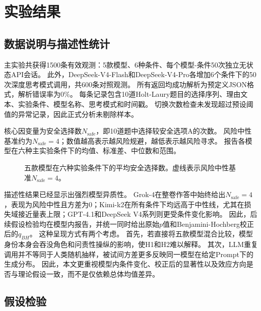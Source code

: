 \section{实验结果}

\subsection{数据说明与描述性统计}

主实验共获得1500条有效观测：5款模型、6种条件、每个模型-条件50次独立无状态API会话。
此外，DeepSeek-V4-Flash和DeepSeek-V4-Pro各增加6个条件下的50次深度思考模式调用，共600条对照观测。
所有返回均成功解析为预定义JSON格式，解析错误率为0\%。
每条记录包含10道Holt-Laury题目的选择序列、理由文本、实验条件、模型名称、思考模式和时间戳。
切换次数检查未发现超过预设阈值的异常记录，因此正式分析未剔除样本。

核心因变量为安全选择数$N_{\text{safe}}$，即10道题中选择较安全选项A的次数。
风险中性基准约为$N_{\text{safe}}=4$；数值越高表示越风险规避，越低表示越风险寻求。
报告各模型在六种主实验条件下的均值、标准差、中位数和范围。



\begin{figure}[!htbp]
  \centering
  
  \caption{五款模型在六种实验条件下的平均安全选择数。虚线表示风险中性基准$N_{\text{safe}}=4$。}
  \label{fig:mean_comparison}
\end{figure}

描述性结果已经显示出强烈模型异质性。
Grok-4在整卷作答中始终给出$N_{\text{safe}}=4$，表现为风险中性且方差为0；Kimi-k2在所有条件下均远高于中性线，尤其在损失域接近量表上限；GPT-4.1和DeepSeek V4系列则更受条件变化影响。
因此，后续假设检验均在模型内报告，并统一同时给出原始$p$值和Benjamini-Hochberg校正后的$q_{BH}$。
这种呈现方式有两个考虑。
首先，若直接将五款模型混合比较，模型身份本身会吞没角色和问责性操纵的影响，使H1和H2难以解释。
其次，LLM重复调用并不等同于人类随机抽样，被试间方差更多反映同一模型在给定Prompt下的生成分布。
因此，本文更重视模型内条件变化、校正后的显著性以及效应方向是否与理论假设一致，而不是仅依赖总体均值差异。

\subsection{假设检验}

